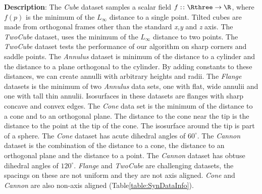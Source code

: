 \textbf{Description}:
The \emph{Cube} dataset samples a scalar field $f:\colon\Rthree \to \R$, where $f(p)$ is the minimum of the $L_{\infty}$ distance to a single point. Tilted cubes are made from orthogonal frames other than the standard \emph{x,y} and \emph{z} axis. The \emph{TwoCube} dataset, uses the minimum of the $L_{\infty}$ distance to two points. The \emph{TwoCube} dataset tests the performance of our algorithm on sharp corners and saddle points. 
The \emph{Annulus} dataset is minimum of the distance to a cylinder and the distance to a plane orthogonal to the cylinder.
By adding constants to these distances, we can create annulli with arbitrary heights and radii.
The \emph{Flange} datasets is the minimum of two \emph{Annulus} data sets,
one with flat, wide annulii and one with tall thin annulii.
Isosurfaces in these datasets are flanges with sharp concave and convex edges.
The \emph{Cone} data set is the minimum of the distance to a cone and to an orthogonal plane.
The distance to the cone near the tip is the distance to the point at the tip of the cone.
The isosurface around the tip is part of a sphere.
The \emph{Cone} dataset has acute dihedral angles of $60^\circ$.
The \emph{Cannon} dataset is the combination of the distance to a cone, the distance to an orthogonal plane
and the distance to a point.
The \emph{Cannon} dataset has obtuse dihedral angles of $120^\circ$.
\emph{Flange} and \emph{TwoCube} are challenging datasets, the spacings on these are not uniform and they are not axis aligned.
\emph{Cone} and \emph{Cannon} are also non-axis aligned (Table\ref{table:SynDataInfo}).

